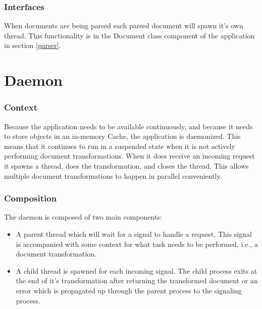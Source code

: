 \subsubsection{Interfaces}

When documents are being parsed each parsed document will spawn it's own thread.
This functionality is in the Document class component of the application in section \ref{parser}.

\section{Daemon}
\label{daemon}

\subsubsection{Context}

Because the application needs to be available continuously, and because it needs to store objects in an in-memory Cache, the application is daemonized.
This means that it continues to run in a suspended state when it is not actively performing document transformations.
When it does receive an incoming request it spawns a thread, does the transformation, and closes the thread.
This allows multiple document transformations to happen in parallel conveniently.

\subsubsection{Composition}

The daemon is composed of two main components:

\begin{itemize}
  \item {
    A parent thread which will wait for a signal to handle a request.
    This signal is accompanied with some context for what task needs to be performed, i.e., a document transformation.
  }
  \item {
    A child thread is spawned for each incoming signal.
    The child process exits at the end of it's transformation after returning the transformed document or an error which is propagated up through the parent process to the signaling process.
  }
\end{itemize}

